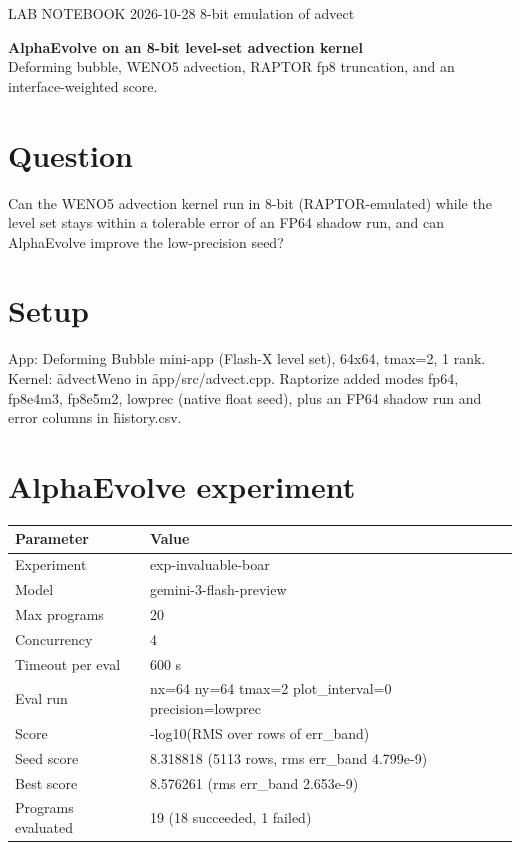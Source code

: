 \documentclass{../style}
\begin{document}
{\small\color{muted}LAB NOTEBOOK \textbullet{} 2026-10-28 \textbullet{} 8-bit emulation of advect}\

{\fontsize{22}{26}\selectfont\bfseries\color{ink} AlphaEvolve on an 8-bit level-set advection kernel}\\[6pt]
{\large\color{muted} Deforming bubble, WENO5 advection, RAPTOR fp8 truncation, and an interface-weighted score.}

\section{Question}
Can the WENO5 advection kernel run in 8-bit (RAPTOR-emulated) while the level set stays within a
tolerable error of an FP64 shadow run, and can AlphaEvolve improve the low-precision seed?

\section{Setup}
App: Deforming Bubble mini-app (Flash-X level set), 64x64, tmax=2, 1 rank. Kernel: \f{advectWeno}
in \f{app/src/advect.cpp}. Raptorize added modes fp64, fp8e4m3, fp8e5m2, lowprec (native float seed),
plus an FP64 shadow run and error columns in \f{history.csv}.

\section{AlphaEvolve experiment}
\begin{center}
\begin{tabular}{@{}ll@{}}
\toprule
Parameter & Value \\
\midrule
Experiment & exp-invaluable-boar \\
Model & gemini-3-flash-preview \\
Max programs & 20 \\
Concurrency & 4 \\
Timeout per eval & 600 s \\
Eval run & nx=64 ny=64 tmax=2 plot\_interval=0 precision=lowprec \\
Score & -log10(RMS over rows of err\_band) \\
Seed score & 8.318818 (5113 rows, rms err\_band 4.799e-9) \\
Best score & 8.576261 (rms err\_band 2.653e-9) \\
Programs evaluated & 19 (18 succeeded, 1 failed) \\
\bottomrule
\end{tabular}
\end{center}
\end{document}
